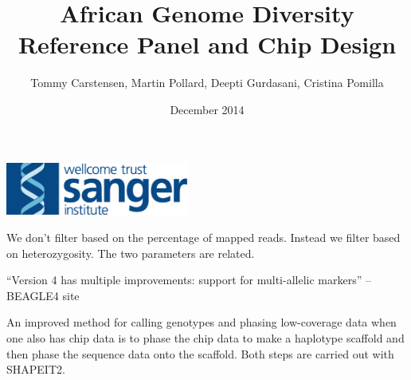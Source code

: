 \documentclass{article}
\title{African Genome Diversity Reference Panel and Chip Design}
\author{Tommy Carstensen, Martin Pollard, Deepti Gurdasani, Cristina Pomilla}
\date{December 2014}
\begin{document}



\maketitle
\centerline{\includegraphics[width=60mm]{sang_logo_large}}





%


We don't filter based on the percentage of mapped reads. Instead we filter based on heterozygosity. The two parameters are related.

“Version 4 has multiple improvements: support for multi-allelic markers” – BEAGLE4 site

An improved method for calling genotypes and phasing low-coverage data when one also has chip data is to phase the chip data to make a haplotype scaffold and then phase the sequence data onto the scaffold. Both steps are carried out with SHAPEIT2.
\end{document}
